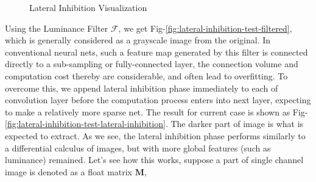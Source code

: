 \documentclass[conference]{IEEEtran}
\begin{document}
\begin{figure}[!t]
\centering
{}
\hfil
{}
\hfil
{}
\hfil
{}
\caption{Lateral Inhibition Visualization}
\label{fig:lateral-inhibition-test}
\end{figure}

Using the Luminance Filter $\mathcal{F}$, we get Fig-\ref{fig:lateral-inhibition-test-filtered},
which is generally considered as a grayscale image from the original.
In conventional neural nets, such a feature map generated by this filter is
connected directly to a sub-sampling or fully-connected layer, the connection volume
and computation cost thereby are considerable, and often lead to overfitting\cite{goodfellow2013maxout}.
To overcome this, we append lateral inhibition phase immediately to each of convolution layer
before the computation process enters into next layer, expecting to make a relatively more sparse net.
The result for current case is shown as Fig-\ref{fig:lateral-inhibition-test-lateral-inhibition}.
The darker part of image is what is expected to extract. As we see, the lateral inhibition
phase performs similarly to a differential calculus of images, but with more global features
(such as luminance) remained. Let's see how this works, suppose a part of single channel image
is denoted as a float matrix $\mathbf{M}$,
\end{document}
